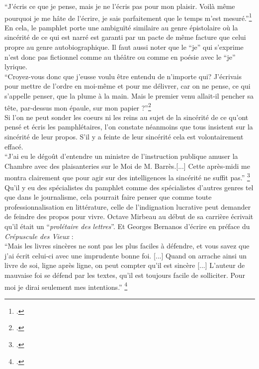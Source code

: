 	\enquote{J'écris ce que je pense, mais je ne l'écris pas pour mon plaisir. Voilà même pourquoi je me hâte de l'écrire, je sais parfaitement que le temps m'est mesuré.}\footcites{bernanos_francais_1961}\\
	
En cela, le pamphlet porte une ambiguïté similaire au genre épistolaire où la sincérité de ce qui est narré est garanti par un pacte de même facture que celui propre au genre autobiographique. Il faut aussi noter que le \enquote{je} qui s'exprime n'est donc pas fictionnel comme au théâtre ou comme en poésie avec le \enquote{je} lyrique. \\

	\enquote{Croyez-vous donc que j'eusse voulu être entendu de n'importe qui? J'écrivais pour mettre de l'ordre en moi-même et pour me délivrer, car on ne pense, ce qui s'appelle penser, que la plume à la main. Mais le premier venu allait-il pencher sa tête, par-dessus mon épaule, sur mon papier ?}\footcites{barres_homme_1889}\\
	
Si l'on ne peut sonder les coeurs ni les reins au sujet de la sincérité de ce qu'ont pensé et écris les pamphlétaires, l'on constate néanmoins que tous insistent sur la sincérité de leur propos. S'il y a feinte de leur sincérité cela est volontairement effacé. \\

	\enquote{J'ai eu le dégoût d'entendre un ministre de l'instruction publique amuser la Chambre avec des plaisanteries sur le Moi de M. Barrès.[...] Cette après-midi me montra clairement que pour agir sur des intelligences la sincérité ne suffit pas.} \footcites{barres_homme_1889}\\

Qu'il y eu des spécialistes du pamphlet comme des spécialistes d'autres genres tel que dans le journalisme, cela pourrait faire penser que comme toute professionnalisation en littérature, celle de l'indignation lucrative peut demander de feindre des propos pour vivre. Octave Mirbeau au début de sa carrière écrivait qu'il était un \enquote{\textit{prolétaire des lettres}}.
Et Georges Bernanos d'écrire en préface du \textit{Crépuscule des Vieux} : \\
	
	\enquote{Mais les livres sincères ne sont pas les plus faciles à défendre, et vous savez que j'ai écrit celui-ci avec une imprudente bonne foi. [...] Quand on arrache ainsi un livre de soi, ligne après ligne, on peut compter qu'il est sincère [...] L'auteur de mauvaise foi se défend par les textes, qu'il est toujours facile de solliciter. Pour moi je dirai seulement mes intentions.} \footcites{bernanos_crepuscule_1956}

